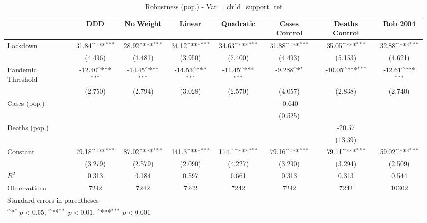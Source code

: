 \documentclass{article}
\begin{document}
{
\def\sym#1{\ifmmode^{#1}\else\(^{#1}\)\fi}
\begin{longtable}{l*{7}{c}}
\caption{Robustness (pop.) - Var = child\_support\_ref}\\
\hline\hline\endfirsthead\hline\endhead\hline\endfoot\endlastfoot
                &\multicolumn{1}{c}{DDD}&\multicolumn{1}{c}{No Weight}&\multicolumn{1}{c}{Linear}&\multicolumn{1}{c}{Quadratic}&\multicolumn{1}{c}{Cases Control}&\multicolumn{1}{c}{Deaths Control}&\multicolumn{1}{c}{Rob 2004}\\
\hline
Lockdown        &    31.84\sym{***}&    28.92\sym{***}&    34.12\sym{***}&    34.63\sym{***}&    31.88\sym{***}&    35.05\sym{***}&    32.88\sym{***}\\
                &  (4.496)         &  (4.481)         &  (3.950)         &  (3.400)         &  (4.493)         &  (5.153)         &  (4.621)         \\
Pandemic Threshold&   -12.40\sym{***}&   -14.45\sym{***}&   -14.53\sym{***}&   -11.45\sym{***}&   -9.288\sym{*}  &   -10.05\sym{***}&   -12.61\sym{***}\\
                &  (2.750)         &  (2.794)         &  (3.028)         &  (2.570)         &  (4.057)         &  (2.838)         &  (2.740)         \\
Cases (pop.)    &                  &                  &                  &                  &   -0.640         &                  &                  \\
                &                  &                  &                  &                  &  (0.525)         &                  &                  \\
Deaths (pop.)   &                  &                  &                  &                  &                  &   -20.57         &                  \\
                &                  &                  &                  &                  &                  &  (13.39)         &                  \\
Constant        &    79.18\sym{***}&    87.02\sym{***}&    141.3\sym{***}&    114.1\sym{***}&    79.16\sym{***}&    79.11\sym{***}&    59.02\sym{***}\\
                &  (3.279)         &  (2.579)         &  (2.090)         &  (4.227)         &  (3.290)         &  (3.294)         &  (2.509)         \\
\hline
\(R^{2}\)       &    0.313         &    0.184         &    0.597         &    0.661         &    0.313         &    0.313         &    0.544         \\
Observations    &     7242         &     7242         &     7242         &     7242         &     7242         &     7242         &    10302         \\
\hline\hline
\multicolumn{8}{l}{\footnotesize Standard errors in parentheses}\\
\multicolumn{8}{l}{\footnotesize \sym{*} \(p<0.05\), \sym{**} \(p<0.01\), \sym{***} \(p<0.001\)}\\
\end{longtable}
}
\end{document}
